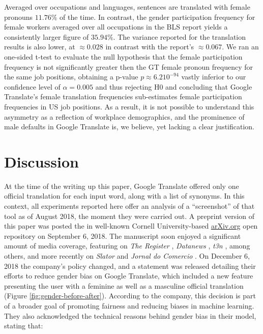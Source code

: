 \documentclass[twoside,11pt]{article}
\begin{document}
Averaged over occupations and languages, sentences are translated with female pronouns $11.76\%$ of the time. In contrast, the gender participation frequency for female workers averaged over all occupations in the BLS report yields a consistently larger figure of $35.94\%$. The variance reported for the translation results is also lower, at $\approx 0.028$ in contrast with the report's $\approx 0.067$. We ran an one-sided t-test to evaluate the null hypothesis that the female participation frequency is not significantly greater then the GT female pronoun frequency for the same job positions, obtaining a p-value $p \approx 6.2 10^{-94}$ vastly inferior to our confidence level of $\alpha = 0.005$ and thus rejecting H0 and concluding that Google Translate's female translation frequencies sub-estimates female participation frequencies in US job positions. As a result, it is not possible to understand this asymmetry as a reflection of workplace demographics, and the prominence of male defaults in Google Translate is, we believe, yet lacking a clear justification.

\section{Discussion}

At the time of the writing up this paper, Google Translate offered only one official translation for each input word, along with a list of synonyms. In this context, all experiments reported here offer an analysis of a   ``screenshot'' of that tool as of August 2018, the moment they were carried out. A preprint version of this paper was posted the in well-known Cornell University-based \url{arXiv.org} open repository on September 6, 2018. The manuscript soon enjoyed a significant amount of media coverage, featuring on \emph{The Register} \cite{clauburn2018boffins}, \emph{Datanews} \cite{bellens2018sexiste}, \emph{t3n} \cite{rixecker2018sexistische}, among others, and more recently on \emph{Slator} \cite{Dino2019hesaid} and \emph{Jornal do Comercio} \cite{knebel2019nosrobos}. On December 6, 2018 the company's policy changed, and a statement was released detailing their efforts to reduce gender bias on Google Translate, which included a new feature presenting the user with a feminine as well as a masculine official translation (Figure \ref{fig:gender-before-after}). According to the company, this decision is part of a broader goal of promoting fairness and reducing biases in machine learning. They also acknowledged the technical reasons behind gender bias in their model, stating that:
\end{document}
